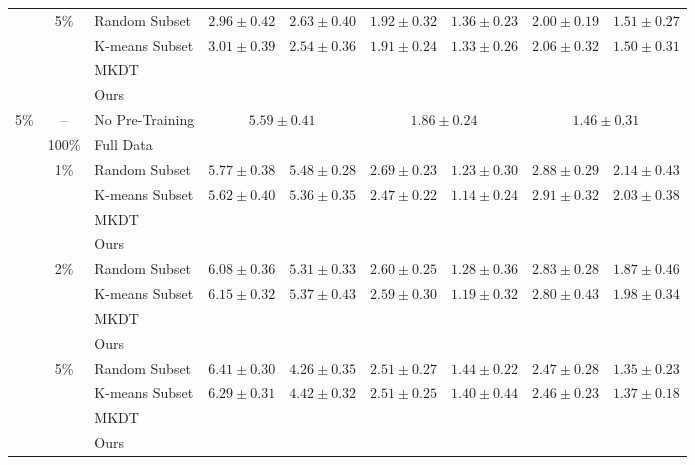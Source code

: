 \begin{table}[t]
{\begin{tabular}{@{}cclcccccc@{}}
& \multirow{4}{*}{5\%} & Random Subset
& $2.96 \pm 0.42$ & $2.63 \pm 0.40$
& $1.92 \pm 0.32$ & $1.36 \pm 0.23$
& $2.00 \pm 0.19$ & $1.51 \pm 0.27$ \\
& & K-means Subset
& $3.01 \pm 0.39$ & $2.54 \pm 0.36$
& $1.91 \pm 0.24$ & $1.33 \pm 0.26$
& $2.06 \pm 0.32$ & $1.50 \pm 0.31$ \\
& & MKDT & & & & & & \\
& & Ours
& &
& &
&  &  \\

\midrule

\multirow{14}{*}{5\%}
& -- & No Pre-Training
& \multicolumn{2}{c}{$5.59 \pm 0.41$}
& \multicolumn{2}{c}{$1.86 \pm 0.24$}
& \multicolumn{2}{c}{$1.46 \pm 0.31$} \\
\cmidrule(lr){2-9}

& 100\% & Full Data
&  & 
&  & 
&  &  \\
\cmidrule(lr){2-9}

& \multirow{4}{*}{1\%} & Random Subset
& $5.77 \pm 0.38$ & $5.48 \pm 0.28$
& $2.69 \pm 0.23$ & $1.23 \pm 0.30$
& $2.88 \pm 0.29$ & $2.14 \pm 0.43$ \\
& & K-means Subset
& $5.62 \pm 0.40$ & $5.36 \pm 0.35$
& $2.47 \pm 0.22$ & $1.14 \pm 0.24$
& $2.91 \pm 0.32$ & $2.03 \pm 0.38$ \\
& & MKDT & & & & & & \\
& & Ours
& &
& &
& & \\
\cmidrule(lr){2-9}

& \multirow{4}{*}{2\%} & Random Subset
& $6.08 \pm 0.36$ & $5.31 \pm 0.33$
& $2.60 \pm 0.25$ & $1.28 \pm 0.36$
& $2.83 \pm 0.28$ & $1.87 \pm 0.46$ \\
& & K-means Subset
& $6.15 \pm 0.32$ & $5.37 \pm 0.43$
& $2.59 \pm 0.30$ & $1.19 \pm 0.32$
& $2.80 \pm 0.43$ & $1.98 \pm 0.34$ \\
& & MKDT & & & & & & \\
& & Ours
& &
& &
&  &  \\
\cmidrule(lr){2-9}

& \multirow{4}{*}{5\%} & Random Subset
& $6.41 \pm 0.30$ & $4.26 \pm 0.35$
& $2.51 \pm 0.27$ & $1.44 \pm 0.22$
& $2.47 \pm 0.28$ & $1.35 \pm 0.23$ \\
& & K-means Subset
& $6.29 \pm 0.31$ & $4.42 \pm 0.32$
& $2.51 \pm 0.25$ & $1.40 \pm 0.44$
& $2.46 \pm 0.23$ & $1.37 \pm 0.18$ \\
& & MKDT & & & & & & \\
& & Ours
&  & 
& &
&  &  \\

\bottomrule
\end{tabular}%
}
\end{table}



